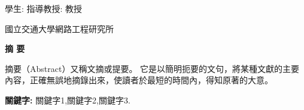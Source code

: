 
\newcommand{\AbstractInstituteChinese}{國立交通大學網路工程研究所}

\newcommand{\AbstractContentChinese}{
摘要（Abstract）又稱文摘或提要。 它是以簡明扼要的文句，將某種文獻的主要內容，正確無誤地摘錄出來，使讀者於最短的時間內，得知原著的大意。 
}
\newcommand{\AbstractKeywordsChinese}{
關鍵字1,關鍵字2,關鍵字3.
}

\begin{center}
	\begin{minipage}{\textwidth}
    \centering
    {\large \textbf{\TitleChinese}\par}
	\end{minipage}
\end{center}


\vspace{0.8cm}  
學生: \StudentNameChinese
\hfill
指導教授: \AdvisorNameChinese 教授

\vspace{0.5cm}
\centerline{\AbstractInstituteChinese}
\vspace{0.5cm}


\begin{center}
	\begin{minipage}[s]{0.2\textwidth}
    \centering
    {\large \textbf{摘 \hfill 要}}
	\end{minipage}
\end{center}

 
\vspace{0.5cm}

\AbstractContentChinese
 
\vspace{1cm} 
{\bf 關鍵字:} \AbstractKeywordsChinese 
